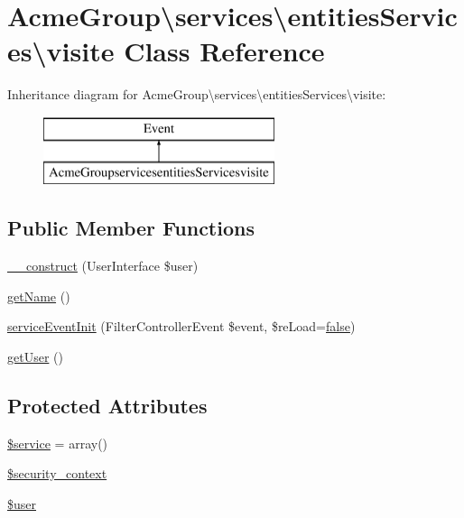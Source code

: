 \hypertarget{class_acme_group_1_1services_1_1entities_services_1_1visite}{\section{Acme\+Group\textbackslash{}services\textbackslash{}entities\+Services\textbackslash{}visite Class Reference}
\label{class_acme_group_1_1services_1_1entities_services_1_1visite}
}
Inheritance diagram for Acme\+Group\textbackslash{}services\textbackslash{}entities\+Services\textbackslash{}visite\+:\begin{figure}[H]
\begin{center}
\leavevmode
\includegraphics[height=2.000000cm]{class_acme_group_1_1services_1_1entities_services_1_1visite}
\end{center}
\end{figure}
\subsection*{Public Member Functions}
\begin{DoxyCompactItemize}
\item 
\hyperlink{class_acme_group_1_1services_1_1entities_services_1_1visite_a386128f1cc090ffb74cc427f3d76d818}{\+\_\+\+\_\+construct} (User\+Interface \$user)
\item 
\hyperlink{class_acme_group_1_1services_1_1entities_services_1_1visite_a6c44cfac0cb6d29d547fef345f69d333}{get\+Name} ()
\item 
\hyperlink{class_acme_group_1_1services_1_1entities_services_1_1visite_ac23688491ee8edfc88d23f687f478382}{service\+Event\+Init} (Filter\+Controller\+Event \$event, \$re\+Load=\hyperlink{validate_8js_a5df37b7f02e5cdc7d9412b7f872b8e01}{false})
\item 
\hyperlink{class_acme_group_1_1services_1_1entities_services_1_1visite_a5f21299dc2f74d26b1463dd029749214}{get\+User} ()
\end{DoxyCompactItemize}
\subsection*{Protected Attributes}
\begin{DoxyCompactItemize}
\item 
\hyperlink{class_acme_group_1_1services_1_1entities_services_1_1visite_a25844814a812d3faae8a7e7cf3900de2}{\$service} = array()
\item 
\hyperlink{class_acme_group_1_1services_1_1entities_services_1_1visite_af967fe56ef7d96b2e52ed1836fdc62f4}{\$security\+\_\+context}
\item 
\hyperlink{class_acme_group_1_1services_1_1entities_services_1_1visite_a914f1b80394dd8f9ffa8d4a4b59ad517}{\$user}
\end{DoxyCompactItemize}


